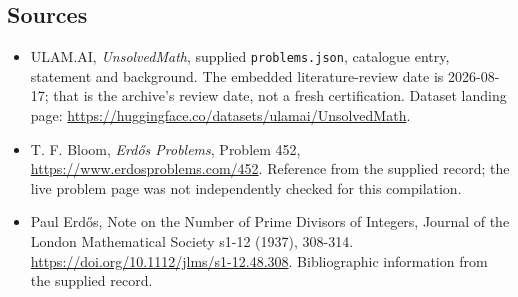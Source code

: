 \documentclass[11pt,a4paper]{article}
\begin{document}
\subsection{Sources}

{\small

\begin{itemize}

\item[\hypertarget{source:statement:1}{S1}] ULAM.AI, \emph{UnsolvedMath}, supplied \texttt{problems.json}, catalogue entry, statement and background. The embedded literature-review date is 2026-08-17; that is the archive’s review date, not a fresh certification. Dataset landing page: \url{https://huggingface.co/datasets/ulamai/UnsolvedMath}.

\item[\hypertarget{source:statement:2}{S2}] T. F. Bloom, \emph{Erdős Problems}, Problem 452, \url{https://www.erdosproblems.com/452}. Reference from the supplied record; the live problem page was not independently checked for this compilation.

\item[\hypertarget{source:statement:3}{S3}] Paul Erdős, Note on the Number of Prime Divisors of Integers, Journal of the London Mathematical Society s1-12 (1937), 308-314. \url{https://doi.org/10.1112/jlms/s1-12.48.308}. Bibliographic information from the supplied record.

\end{itemize}

}

\label{end:statement}
\end{document}
